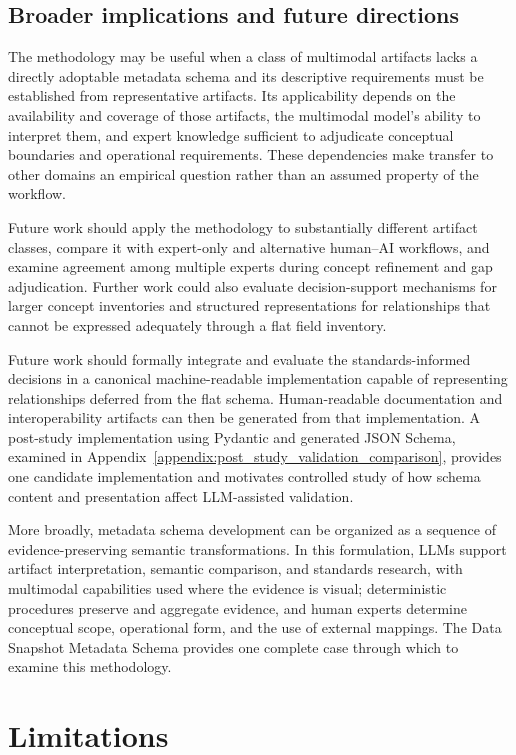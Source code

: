 \documentclass{article}
\begin{document}
\subsection{Broader implications and future directions}

The methodology may be useful when a class of multimodal artifacts lacks a directly adoptable metadata schema and its descriptive requirements must be established from representative artifacts. Its applicability depends on the availability and coverage of those artifacts, the multimodal model's ability to interpret them, and expert knowledge sufficient to adjudicate conceptual boundaries and operational requirements. These dependencies make transfer to other domains an empirical question rather than an assumed property of the workflow.

Future work should apply the methodology to substantially different artifact classes, compare it with expert-only and alternative human--AI workflows, and examine agreement among multiple experts during concept refinement and gap adjudication. Further work could also evaluate decision-support mechanisms for larger concept inventories and structured representations for relationships that cannot be expressed adequately through a flat field inventory.

Future work should formally integrate and evaluate the standards-informed decisions in a canonical machine-readable implementation capable of representing relationships deferred from the flat schema. Human-readable documentation and interoperability artifacts can then be generated from that implementation. A post-study implementation using Pydantic and generated JSON Schema, examined in Appendix~\ref{appendix:post_study_validation_comparison}, provides one candidate implementation and motivates controlled study of how schema content and presentation affect LLM-assisted validation.

More broadly, metadata schema development can be organized as a sequence of evidence-preserving semantic transformations. In this formulation, LLMs support artifact interpretation, semantic comparison, and standards research, with multimodal capabilities used where the evidence is visual; deterministic procedures preserve and aggregate evidence, and human experts determine conceptual scope, operational form, and the use of external mappings. The Data Snapshot Metadata Schema provides one complete case through which to examine this methodology.

\section{Limitations}
\end{document}
